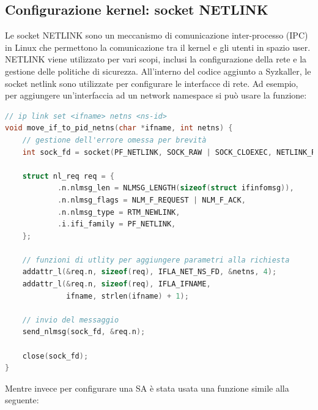 \documentclass{article}
\begin{document}
\subsection{Configurazione kernel: socket NETLINK}
Le socket NETLINK sono un meccanismo di comunicazione inter-processo (IPC) in Linux che 
permettono la comunicazione tra il kernel e gli utenti in spazio user. NETLINK viene utilizzato
per vari scopi, inclusi la configurazione della rete e la gestione delle politiche di 
sicurezza. All'interno del codice aggiunto a Syzkaller, le socket netlink sono utilizzate 
per configurare le interfacce di rete. Ad esempio, per aggiungere un'interfaccia ad 
un network namespace si può usare la funzione:

\begin{lstlisting}[language=C,caption=Migrazione di un'interfaccia di rete in un network namespace con messaggi Netlink in C]
// ip link set <ifname> netns <ns-id>
void move_if_to_pid_netns(char *ifname, int netns) {
    // gestione dell'errore omessa per brevità
    int sock_fd = socket(PF_NETLINK, SOCK_RAW | SOCK_CLOEXEC, NETLINK_ROUTE);

    struct nl_req req = {
            .n.nlmsg_len = NLMSG_LENGTH(sizeof(struct ifinfomsg)),
            .n.nlmsg_flags = NLM_F_REQUEST | NLM_F_ACK,
            .n.nlmsg_type = RTM_NEWLINK,
            .i.ifi_family = PF_NETLINK,
    };

    // funzioni di utlity per aggiungere parametri alla richiesta
    addattr_l(&req.n, sizeof(req), IFLA_NET_NS_FD, &netns, 4);
    addattr_l(&req.n, sizeof(req), IFLA_IFNAME,
              ifname, strlen(ifname) + 1);

    // invio del messaggio
    send_nlmsg(sock_fd, &req.n);

    close(sock_fd);
} 
\end{lstlisting}

Mentre invece per configurare una SA è stata usata una funzione simile alla seguente:
\end{document}
